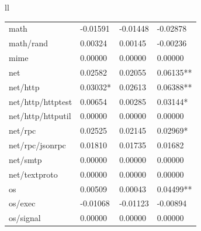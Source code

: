 \documentclass{seal_thesis}
\begin{document}
\begin{table}[H]
\begin{tabular}{ll}
{\begin{tabular}{@{}llll@{}}
		math & \cellcolor[HTML]{333399}\color{white}-0.01591 & \cellcolor[HTML]{333399}\color{white}-0.01448 & \cellcolor[HTML]{333399}\color{white}-0.02878 \\
		math/rand & \cellcolor[HTML]{333399}\color{white}0.00324 & \cellcolor[HTML]{333399}\color{white}0.00145 & \cellcolor[HTML]{333399}\color{white}-0.00236 \\
		mime & \cellcolor[HTML]{333399}\color{white}0.00000 & \cellcolor[HTML]{333399}\color{white}0.00000 & \cellcolor[HTML]{333399}\color{white}0.00000 \\
		net & \cellcolor[HTML]{3366FF}0.02582 & \cellcolor[HTML]{3366FF}0.02055 & \cellcolor[HTML]{3366FF}0.06135** \\
		net/http & \cellcolor[HTML]{3366FF}0.03032* & \cellcolor[HTML]{3366FF}0.02613 & \cellcolor[HTML]{3366FF}0.06388** \\
		net/http/httptest & \cellcolor[HTML]{333399}\color{white}0.00654 & \cellcolor[HTML]{333399}\color{white}0.00285 & \cellcolor[HTML]{3366FF}0.03144* \\
		net/http/httputil & \cellcolor[HTML]{333399}\color{white}0.00000 & \cellcolor[HTML]{333399}\color{white}0.00000 & \cellcolor[HTML]{333399}\color{white}0.00000 \\
		net/rpc & \cellcolor[HTML]{3366FF}0.02525 & \cellcolor[HTML]{3366FF}0.02145 & \cellcolor[HTML]{3366FF}0.02969* \\
		net/rpc/jsonrpc & \cellcolor[HTML]{333399}\color{white}0.01810 & \cellcolor[HTML]{333399}\color{white}0.01735 & \cellcolor[HTML]{333399}\color{white}0.01682 \\
		net/smtp & \cellcolor[HTML]{333399}\color{white}0.00000 & \cellcolor[HTML]{333399}\color{white}0.00000 & \cellcolor[HTML]{333399}\color{white}0.00000 \\
		net/textproto & \cellcolor[HTML]{333399}\color{white}0.00000 & \cellcolor[HTML]{333399}\color{white}0.00000 & \cellcolor[HTML]{333399}\color{white}0.00000 \\
		os & \cellcolor[HTML]{333399}\color{white}0.00509 & \cellcolor[HTML]{333399}\color{white}0.00043 & \cellcolor[HTML]{3366FF}0.04499** \\
		os/exec & \cellcolor[HTML]{333399}\color{white}-0.01068 & \cellcolor[HTML]{333399}\color{white}-0.01123 & \cellcolor[HTML]{333399}\color{white}-0.00894 \\
		os/signal & \cellcolor[HTML]{333399}\color{white}0.00000 & \cellcolor[HTML]{333399}\color{white}0.00000 & \cellcolor[HTML]{333399}\color{white}0.00000 \\

\end{tabular}}
\end{tabular}
\end{table}
\end{document}
